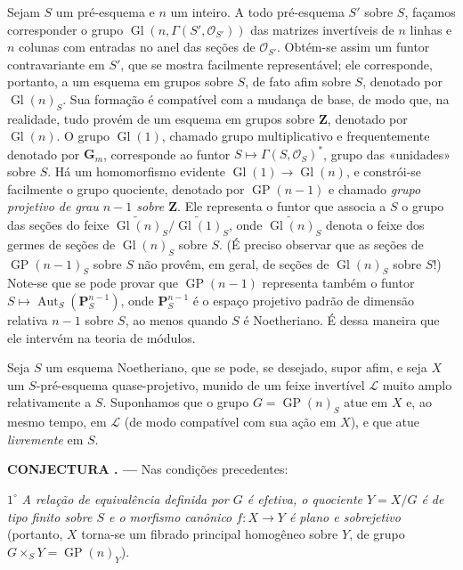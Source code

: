 \documentclass[11pt,twoside,openany]{book}
\numberwithin{equation}{section}
\newcommand{\src}[1]{%
  \phantomsection\hypertarget{src:#1}{}%
  \marginpar{\raggedleft\footnotesize\sffamily #1}%
}
\theoremstyle{plain}
\theoremstyle{definition}
\theoremstyle{remark}
\newcommand{\result}[2]{%
  \par\medskip\noindent\textbf{#1%
  \if\relax\detokenize{#2}\relax\else\space#2\fi. ---}\enspace
}
\newcommand{\FgaUnitKey}{frontmatter}
\renewcommand{\src}[1]{%
  \phantomsection\hypertarget{src:\FgaUnitKey:#1}{}%
  \marginpar{\raggedleft\footnotesize\sffamily #1}%
}
\begin{document}
Sejam $S$ um pré-esquema e $n$ um inteiro. A todo pré-esquema $S'$ sobre $S$,
façamos corresponder o grupo
$\operatorname{Gl}(n,\Gamma(S',\mathcal O_{S'}))$ das matrizes invertíveis de
$n$ linhas e $n$ colunas com entradas no anel das seções de
$\mathcal O_{S'}$. Obtém-se assim um funtor contravariante em $S'$, que se
mostra facilmente representável; ele corresponde, portanto, a um esquema em
grupos sobre $S$, de fato afim sobre $S$, denotado por $\operatorname{Gl}(n)_S$.
Sua formação é compatível com a mudança de base, de modo que, na realidade,
tudo provém de um esquema em grupos sobre $\mathbf Z$, denotado por
$\operatorname{Gl}(n)$. O grupo $\operatorname{Gl}(1)$, chamado grupo
multiplicativo e frequentemente denotado por $\mathbf G_m$, corresponde ao
funtor $S\longmapsto\Gamma(S,\mathcal O_S)^*$, grupo das «unidades» sobre $S$.
Há um homomorfismo evidente
$\operatorname{Gl}(1)\to\operatorname{Gl}(n)$, e constrói-se facilmente o
grupo quociente, denotado por $\operatorname{GP}(n-1)$ e chamado
\emph{grupo projetivo de grau $n-1$ sobre $\mathbf Z$}. Ele representa o
funtor que associa a $S$ o grupo das seções do feixe
$\widetilde{\operatorname{Gl}(n)}_S/
\widetilde{\operatorname{Gl}(1)}_S$, onde
$\widetilde{\operatorname{Gl}(n)}_S$ denota o feixe dos germes de seções de
$\operatorname{Gl}(n)_S$ sobre $S$. (É preciso observar que as seções de
$\operatorname{GP}(n-1)_S$ sobre $S$ não provêm, em geral, de seções de
$\operatorname{Gl}(n)_S$ sobre $S$!) Note-se que se pode provar que
$\operatorname{GP}(n-1)$ representa também o funtor
$S\longmapsto\operatorname{Aut}_S(\mathbf P_S^{n-1})$, onde
$\mathbf P_S^{n-1}$ é o espaço projetivo padrão de dimensão relativa $n-1$
sobre $S$, ao menos quando $S$ é Noetheriano. É dessa maneira que ele intervém
na teoria de módulos.

Seja $S$ um esquema Noetheriano, que se pode, se desejado, supor afim, e seja
$X$ um $S$-pré-esquema quase-projetivo, munido de um feixe invertível
$\mathcal L$ muito amplo relativamente a $S$. Suponhamos que o grupo
$G=\operatorname{GP}(n)_S$ atue em $X$ e, ao mesmo tempo, em $\mathcal L$ (de
modo compatível com sua ação em $X$), e que atue \emph{livremente} em
$S$.
\src{117}

\result{CONJECTURA}{8.1} Nas condições precedentes:

\smallskip
\noindent $1^\circ$ \emph{A relação de equivalência definida por $G$ é
efetiva, o quociente $Y=X/G$ é de tipo finito sobre $S$ e o morfismo canônico
$f:X\to Y$ é plano e sobrejetivo} (portanto, $X$ torna-se um fibrado principal
homogêneo sobre $Y$, de grupo
$G\times_S Y=\operatorname{GP}(n)_Y$).
\end{document}
